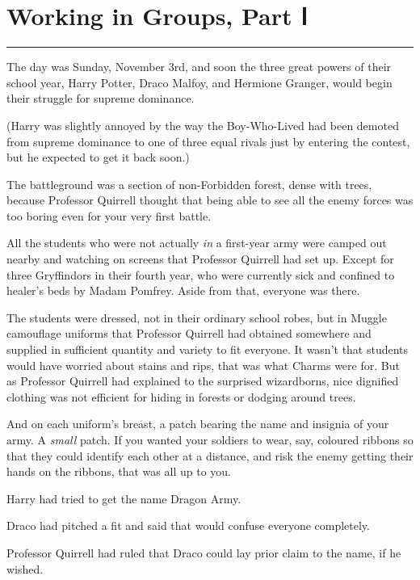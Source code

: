 \chapter{Working in Groups, Part Ⅰ}\label{working-in-groups-part}

\begin{center}\rule{3in}{0.4pt}\end{center}

The day was Sunday, November 3rd, and soon the three great powers of
their school year, Harry Potter, Draco Malfoy, and Hermione Granger,
would begin their struggle for supreme dominance.

(Harry was slightly annoyed by the way the Boy-Who-Lived had been
demoted from supreme dominance to one of three equal rivals just by
entering the contest, but he expected to get it back soon.)

The battleground was a section of non-Forbidden forest, dense with
trees, because Professor Quirrell thought that being able to see all the
enemy forces was too boring even for your very first battle.

All the students who were not actually \emph{in} a first-year army were
camped out nearby and watching on screens that Professor Quirrell had
set up. Except for three Gryffindors in their fourth year, who were
currently sick and confined to healer's beds by Madam Pomfrey. Aside
from that, everyone was there.

The students were dressed, not in their ordinary school robes, but in
Muggle camouflage uniforms that Professor Quirrell had obtained
somewhere and supplied in sufficient quantity and variety to fit
everyone. It wasn't that students would have worried about stains and
rips, that was what Charms were for. But as Professor Quirrell had
explained to the surprised wizardborns, nice dignified clothing was not
efficient for hiding in forests or dodging around trees.

And on each uniform's breast, a patch bearing the name and insignia of
your army. A \emph{small} patch. If you wanted your soldiers to wear,
say, coloured ribbons so that they could identify each other at a
distance, and risk the enemy getting their hands on the ribbons, that
was all up to you.

Harry had tried to get the name Dragon Army.

Draco had pitched a fit and said that would confuse everyone completely.

Professor Quirrell had ruled that Draco could lay prior claim to the
name, if he wished.

